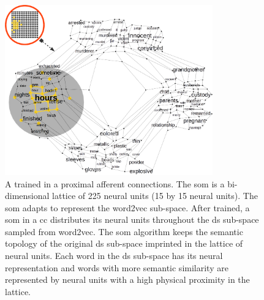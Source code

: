 {\begin{figure}[ht!]
    \centering
    \includegraphics[width=0.8\textwidth]{CorticalColumnTrainedSOM.png}
    \caption{A trained  in a  proximal afferent connections. The \gls{som} is a bi-dimensional lattice of 225 neural units (15 by 15 neural units). The \gls{som} adapts to represent the word2vec  sub-space. After trained, a \gls{som} in a \gls{cc} distributes its neural units throughout the \gls{ds} sub-space sampled from word2vec. The \gls{som} algorithm keeps the semantic topology of the original \gls{ds} sub-space imprinted in the lattice of neural units. Each word in the \gls{ds} sub-space has its neural representation and words with more semantic similarity are represented by neural units with a high physical proximity in the lattice.}
    \label{fig:CorticalColumnTrainedSOM}
\end{figure}

}

